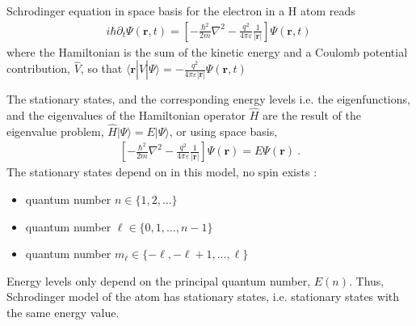 \documentclass[letterpaper,10pt,english]{jupyterBook}
\begin{document}
\sphinxAtStartPar
{} Schrodinger equation in space basis for the electron in a \(\text{H}\) atom reads
\begin{equation*}
\begin{split}i \hbar \partial_t \Psi(\mathbf{r},t) = \left[ -\frac{\hbar^2}{2m} \nabla^2 - \frac{q^2}{4 \pi \varepsilon}\frac{1}{|\mathbf{r}|} \right] \Psi(\mathbf{r},t) \ \end{split}
\end{equation*}
\sphinxAtStartPar
where the Hamiltonian is the sum of the kinetic energy and a Coulomb potential contribution, \(\hat{V}\), so that \(\langle \mathbf{r} | \hat{V} | \Psi \rangle = - \frac{q^2}{4 \pi \varepsilon |\mathbf{r}|} \Psi(\mathbf{r},t)\)

\sphinxAtStartPar
{} The stationary states, and the corresponding energy levels \sphinxhyphen{} i.e. the eigenfunctions, and the eigenvalues of the Hamiltonian operator \(\hat{H}\) \sphinxhyphen{} are the result of the eigenvalue problem, \(\hat{H} | \Psi \rangle = E | \Psi \rangle\), or using space basis,
\begin{equation*}
\begin{split}\left[ -\frac{\hbar^2}{2m} \nabla^2 - \frac{q^2}{4 \pi \varepsilon}\frac{1}{|\mathbf{r}|} \right] \Psi(\mathbf{r}) = E \Psi(\mathbf{r}) \ .\end{split}
\end{equation*}
\sphinxAtStartPar
{} The stationary states depend on  \sphinxhyphen{} in this model, no spin exists \sphinxhyphen{} :
\begin{itemize}
\item {} 
\sphinxAtStartPar
{} quantum number \(n \in \{ 1, 2, \dots \}\)

\item {} 
\sphinxAtStartPar
{} quantum number \(\ell \in \{ 0, 1,\dots, n-1 \} \)

\item {} 
\sphinxAtStartPar
{} quantum number \(m_{\ell} \in \{ -\ell, -\ell+1, \dots, \ell \}\)

\end{itemize}

\sphinxAtStartPar
Energy levels only depend on the principal quantum number, \(E(n)\). Thus, Schrodinger model of the atom has  stationary states, i.e. stationary states with the same energy value.
\end{document}
